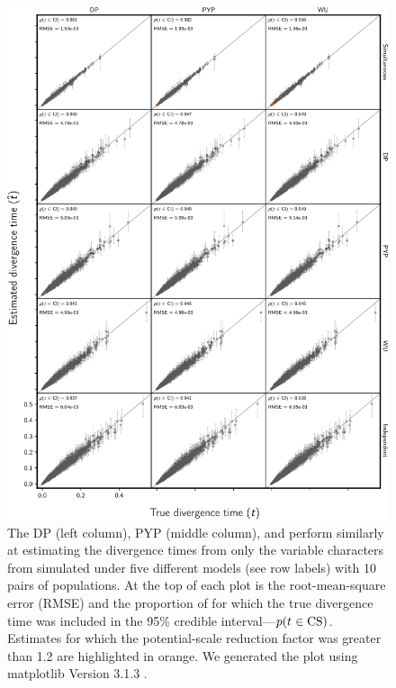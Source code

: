 \begin{figure}[htbp]
    \begin{center}
        \includegraphics[width=\textwidth,height=0.9\textheight,keepaspectratio]{../images/from-project-repo/var-only-infer-columns-by-data-rows-div-time-scatter-cropped.pdf}
        \captionsetup{name=Figure S, labelformat=noSpace, listformat=sFigList}
        \caption{\footnotesize
        The DP (left column),
        PYP (middle column),
        and
        \wunif
        perform similarly at estimating the divergence times from only the
        variable characters from \datasets simulated under five different
        models (see row labels) with 10 pairs of populations.
        At the top of each plot is the root-mean-square error (RMSE)
        and
        the proportion of \datasets for which the true divergence time was
        included in the 95\% credible interval---$p(t_{} \in
        \textrm{CS})$.
        Estimates for which the potential-scale reduction factor was greater
        than 1.2 \citep{Brooks1998} are highlighted in orange.
        We generated the plot using matplotlib Version 3.1.3
        \citep{matplotlib}.
        }
        \label{fig:varonlydivtimegrid}
    \end{center}
\end{figure}


